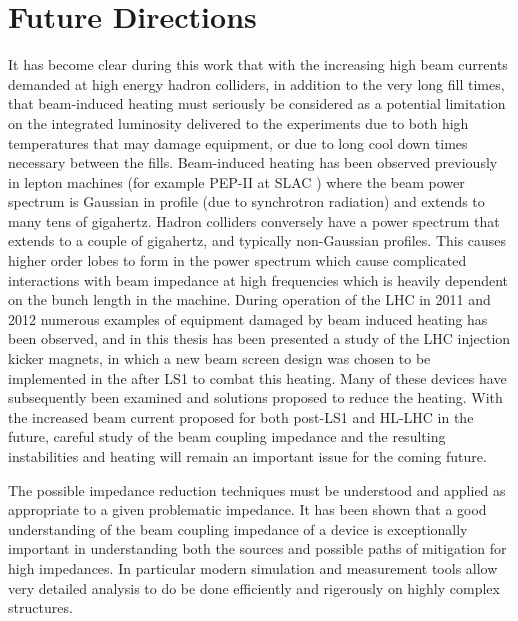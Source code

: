 \section{Future Directions}

It has become clear during this work that with the increasing high beam currents demanded at high energy hadron colliders, in addition to the very long fill times, that beam-induced heating must seriously be considered as a potential limitation on the integrated luminosity delivered to the experiments due to both high temperatures that may damage equipment, or due to long cool down times necessary between the fills. Beam-induced heating has been observed previously in lepton machines (for example PEP-II at SLAC \cite{Pivi:PEP}) where the beam power spectrum is Gaussian in profile (due to synchrotron radiation) and extends to many tens of gigahertz. Hadron colliders conversely have a power spectrum that extends to a couple of gigahertz, and typically non-Gaussian profiles. This causes higher order lobes to form in the power spectrum which cause complicated interactions with beam impedance at high frequencies which is heavily dependent on the bunch length in the machine. During operation of the LHC in 2011 and 2012 numerous examples of equipment damaged by beam induced heating has been observed, and in this thesis has been presented a study of the LHC injection kicker magnets, in which a new beam screen design was chosen to be implemented in the after LS1 to combat this heating. Many of these devices have subsequently been examined and solutions proposed to reduce the heating. With the increased beam current proposed for both post-LS1 and HL-LHC in the future, careful study of the beam coupling impedance and the resulting instabilities and heating will remain an important issue for the coming future.

The possible impedance reduction techniques must be understood and applied as appropriate to a given problematic impedance. It has been shown that a good understanding of the beam coupling impedance of a device is exceptionally important in understanding both the sources and possible paths of mitigation for high impedances. In particular modern simulation and measurement tools allow very detailed analysis to do be done efficiently and rigerously on highly complex structures. 